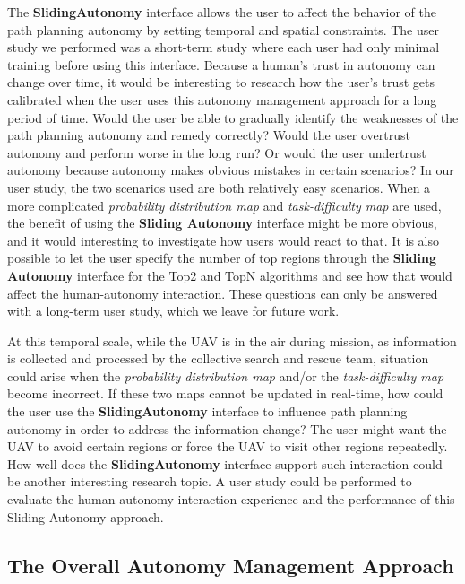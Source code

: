 The \textbf{SlidingAutonomy} interface allows the user to affect the behavior of the path planning autonomy by setting temporal and spatial constraints. The user study we performed was a short-term study where each user had only minimal training before using this interface. Because a human's trust in autonomy can change over time, it would be interesting to research how the user's trust gets calibrated when the user uses this autonomy management approach for a long period of time. Would the user be able to gradually identify the weaknesses of the path planning autonomy and remedy correctly? Would the user overtrust autonomy and perform worse in the long run? Or would the user undertrust autonomy because autonomy makes obvious mistakes in certain scenarios? In our user study, the two scenarios used are both relatively easy scenarios. When a more complicated \textit{probability distribution map} and \textit{task-difficulty map} are used, the benefit of using the \textbf{Sliding Autonomy} interface might be more obvious, and it would interesting to investigate how users would react to that. It is also possible to let the user specify the number of top regions through the \textbf{Sliding Autonomy} interface for the Top2 and TopN algorithms and see how that would affect the human-autonomy interaction. These questions can only be answered with a long-term user study, which we leave for future work.

At this temporal scale, while the UAV is in the air during mission, as information is collected and processed by the collective search and rescue team, situation could arise when the \textit{probability distribution map} and/or the \textit{task-difficulty map} become incorrect. If these two maps cannot be updated in real-time, how could the user use the \textbf{SlidingAutonomy} interface to influence path planning autonomy in order to address the information change? The user might want the UAV to avoid certain regions or force the UAV to visit other regions repeatedly. How well does the \textbf{SlidingAutonomy} interface support such interaction could be another interesting research topic. A user study could be performed to evaluate the human-autonomy interaction experience and the performance of this Sliding Autonomy approach.


\subsection{The Overall Autonomy Management Approach}

